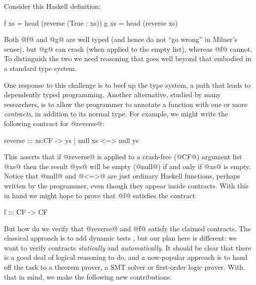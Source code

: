 Consider this Haskell definition:
\begin{code}
  f xs = head (reverse (True : xs))
  g xs = head (reverse xs)
\end{code}
Both @f@ and @g@ are well typed (and hence do not ``go wrong'' in Milner's sense),
but @g@ can crash (when applied to the empty list), whereas @f@ cannot.
To distinguish the two we need reasoning that goes well beyond 
that embodied in a standard type system.

One response to this challenge is to beef up the type system, a 
path that leads to dependently typed programming.  Another alternative,
studied by many researchers, is to allow the programmer to 
annotate a function with one or more
\emph{contracts}, in addition to its normal type.
For example, we might write the following contract for @reverse@:
\begin{code}
reverse ::: xs:CF -> { ys | null xs <=> null ys }
\end{code}
This asserts that if @reverse@ is applied to a crash-free (@CF@) argument list @xs@
then the result @ys@ will be empty (@null@) if and only if @xs@ is empty.
Notice that @null@ and @<=>@ are just ordinary Haskell functions, perhaps
written by the programmer, even though they appear inside contracts.
With this in hand we might hope to prove that @f@ satisfies the contract
\begin{code}
  f ::: CF -> CF
\end{code}
But how do we verify that @reverse@ and @f@ satisfy the claimed
contracts.  The classical approach is to add dynamic tests
\cite{finder-felliesen}, but our plan here is different: we want to
verify contracts \emph{statically} and \emph{automatically}.  It
should be clear that there is a good deal of logical reasoning to do,
and a now-popular approach is to hand off the task to a theorem
prover, a SMT solver or first-order logic prover.
With that in mind, we make the following new contributions:

